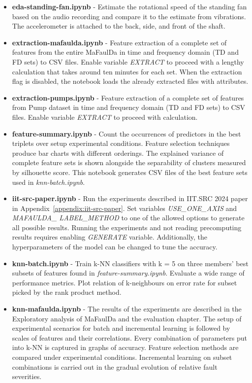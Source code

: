 \begin{itemize}[noitemsep]
\item \textbf{eda-standing-fan.ipynb} - Estimate the rotational speed of the standing fan based on the audio recording and compare it to the estimate from vibrations. The accelerometer is attached to the back, side, and front of the shaft.

\item \textbf{extraction-mafaulda.ipynb} - Feature extraction of a complete set of features from the entire MaFaulDa in time and frequency domain (TD and FD sets) to CSV files. Enable variable \emph{EXTRACT} to proceed with a lengthy calculation that takes around ten minutes for each set. When the extraction flag is disabled, the notebook loads the already extracted files with attributes.

\item \textbf{extraction-pumps.ipynb} - Feature extraction of a complete set of features from Pump dataset in time and frequency domain (TD and FD sets) to CSV files. Enable variable \emph{EXTRACT} to proceed with calculation.

\item \textbf{feature-summary.ipynb} - Count the occurrences of predictors in the best triplets over setup experimental conditions. Feature selection techniques produce bar charts with different orderings. The explained variance of complete feature sets is shown alongside the separability of clusters measured by silhouette score. This notebook generates CSV files of the best feature sets used in \emph{knn-batch.ipynb}.

\item \textbf{iit-src-paper.ipynb} - Run the experiments described in IIT.SRC 2024 paper in Appendix~\ref{appendix:iit-src-paper}. Set variables \emph{USE\_ONE\_AXIS} and \emph{MAFAULDA\_ LABEL\_METHOD} to one of the allowed options to generate all possible results. Running the experiments and not reading precomputing results requires enabling \emph{GENERATE} variable. Additionally, the hyperparameters of the model can be changed to tune the accuracy.

\item \textbf{knn-batch.ipynb} - Train k-NN classifiers with k = 5 on three members' best subsets of features found in \emph{feature-summary.ipynb}. Evaluate a wide range of performance metrics. Plot relation of k-neighbours on error rate for subset picked by the rank product method.

\item \textbf{knn-mafaulda.ipynb} - The results of the experiments are described in the Exploratory analysis of MaFaulDa and the evaluation chapter. The setup of experimental scenarios for batch and incremental learning is followed by scales of features and their correlations. Every combination of parameters put into k-NN is captured in graphs of accuracy. Feature selection methods are compared under experimental conditions. Incremental learning on subset combinations is carried out in the gradual evolution of relative fault severities.


\end{itemize}

